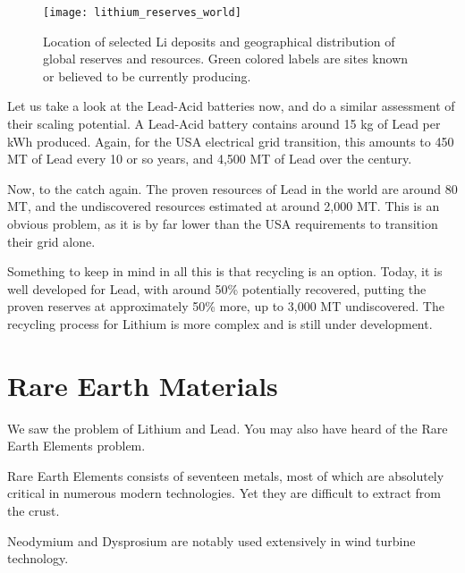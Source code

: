 \begin{figure*}[h]
	\texttt{[image: lithium\_reserves\_world]}
	\caption[Location of selected Li deposits and geographical distribution of global reserves and resources. Green colored labels are sites
known or believed to be currently producing.]{Location of selected Li deposits and geographical distribution of global reserves and resources. Green colored labels are sites
known or believed to be currently producing.}
\end{figure*}

Let us take a look at the Lead-Acid batteries now, and do a similar assessment of their scaling potential. A Lead-Acid battery contains around 15 kg of Lead per kWh produced. Again, for the USA electrical grid transition, this amounts to 450 MT of Lead every 10 or so years, and 4,500 MT of Lead over the century.

Now, to the catch again. The proven resources of Lead in the world are around 80 MT, and the undiscovered resources estimated at around 2,000 MT. This is an obvious problem, as it is by far lower than the USA requirements to transition their grid alone.

Something to keep in mind in all this is that recycling is an option. Today, it is well developed for Lead, with around 50\% potentially recovered, putting the proven reserves at approximately 50\% more, up to 3,000 MT undiscovered. The recycling process for Lithium is more complex and is still under development. 

\section{Rare Earth Materials}

We saw the problem of Lithium and Lead. You may also have heard of the Rare Earth Elements problem.

\begin{kaobox}[frametitle=Rare Earth Materials]

Rare Earth Elements consists of seventeen metals, most of which are absolutely critical in numerous modern technologies. Yet they are difficult to extract from the crust.

Neodymium and Dysprosium are notably used extensively in wind turbine technology.

\end{kaobox}

